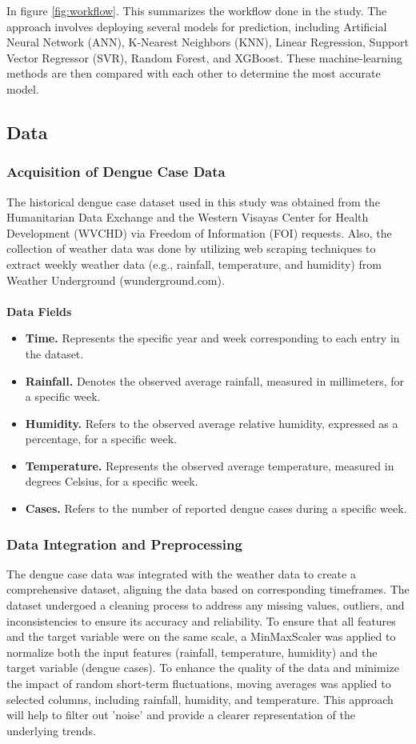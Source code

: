 \documentclass{article}
\begin{document}
In figure \ref{fig:workflow}. This summarizes the workflow done in the study. The approach involves deploying several models for prediction, including Artificial Neural Network (ANN), K-Nearest Neighbors (KNN), Linear Regression, Support Vector Regressor (SVR), Random Forest, and XGBoost. These machine-learning methods are then compared with each other to determine the most accurate model.

\subsection{Data}
\subsubsection{Acquisition of Dengue Case Data}
The historical dengue case dataset used in this study was obtained from the Humanitarian Data Exchange and the Western Visayas Center for Health Development (WVCHD) via Freedom of Information (FOI) requests. Also, the collection of weather data was done by utilizing web scraping techniques to extract weekly weather data (e.g., rainfall, temperature, and humidity) from Weather Underground (wunderground.com).
\\
\\
\textbf{Data Fields}
\begin{itemize}
    \item \textbf{Time.} Represents the specific year and week corresponding to each entry in the dataset.
    \item \textbf{Rainfall.} Denotes the observed average rainfall, measured in millimeters, for a specific week.
    \item \textbf{Humidity.} Refers to the observed average relative humidity, expressed as a percentage, for a specific week.    
    \item \textbf{Temperature.} Represents the observed average temperature, measured in degrees Celsius, for a specific week.
    \item \textbf{Cases.} Refers to the number of reported dengue cases during a specific week.
\end{itemize} 

\subsubsection{Data Integration and Preprocessing}
The dengue case data was integrated with the weather data to create a comprehensive dataset, aligning the data based on corresponding timeframes. The dataset undergoed a cleaning process to address any missing values, outliers, and inconsistencies to ensure its accuracy and reliability. To ensure that all features and the target variable were on the same scale, a MinMaxScaler was applied to normalize both the input features (rainfall, temperature, humidity) and the target variable (dengue cases). To enhance the quality of the data and minimize the impact of random short-term fluctuations, moving averages was applied to selected columns, including rainfall, humidity, and temperature. This approach will help to filter out 'noise' and provide a clearer representation of the underlying trends.
\end{document}
